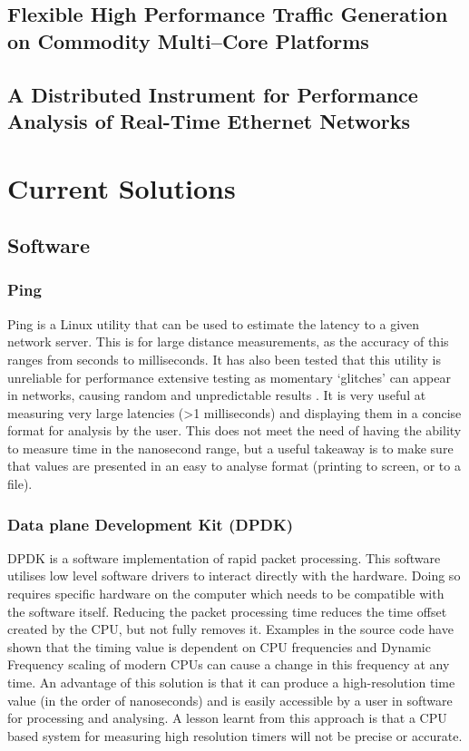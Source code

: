 \subsection{Flexible High Performance Traffic Generation on Commodity Multi–Core Platforms}

\subsection{A Distributed Instrument for Performance Analysis of Real-Time Ethernet Networks}

\section{Current Solutions}

\subsection{Software}

\subsubsection{Ping}

Ping is a Linux utility that can be used to estimate the latency to a given network server. 
This is for large distance measurements, as the accuracy of this ranges from seconds to milliseconds. 
It has also been tested that this utility is unreliable for performance extensive testing as momentary ‘glitches’ can appear in networks, causing random and unpredictable results \cite{pingisbad}.
It is very useful at measuring very large latencies (>1 milliseconds) and displaying them in a concise format for analysis by the user. 
This does not meet the need of having the ability to measure time in the nanosecond range, but a useful takeaway is to make sure that values are presented in an easy to analyse format (printing to screen, or to a file).

\subsubsection{Data plane Development Kit (DPDK)}

DPDK is a software implementation of rapid packet processing. 
This software utilises low level software drivers to interact directly with the hardware. 
Doing so requires specific hardware on the computer which needs to be compatible with the software itself.
Reducing the packet processing time reduces the time offset created by the CPU, but not fully removes it. 
Examples in the source code have shown that the timing value is dependent on CPU frequencies \cite{dpdkcode} and Dynamic Frequency scaling \cite{turboboost} of modern CPUs can cause a change in this frequency at any time.
An advantage of this solution is that it can produce a high-resolution time value (in the order of nanoseconds) and is easily accessible by a user in software for processing and analysing. 
A lesson learnt from this approach is that a CPU based system for measuring high resolution timers will not be precise or accurate.

